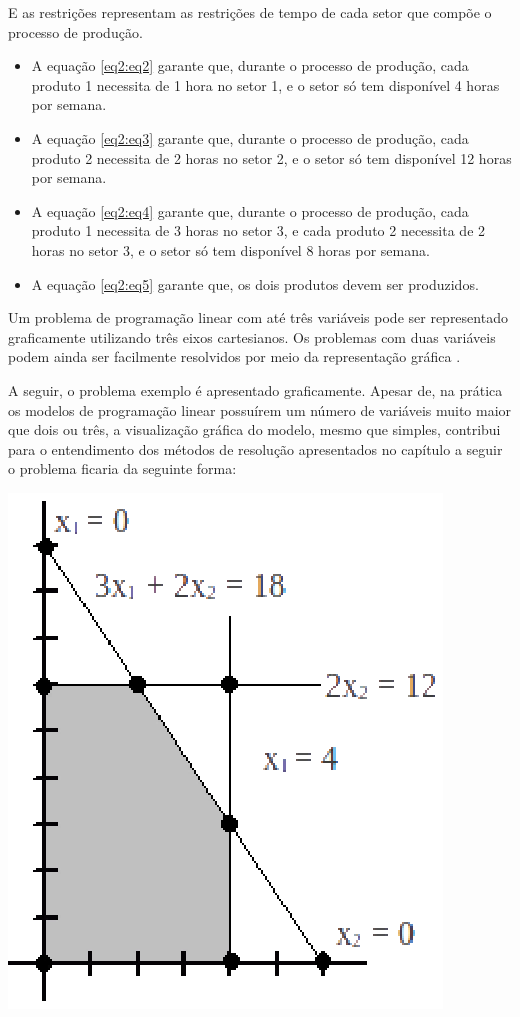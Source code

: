 E as restrições representam as restrições de tempo de cada setor que compõe o processo de produção.
\begin{itemize}
\item A equação \ref{eq2:eq2} garante que, durante o processo de produção, cada produto 1 necessita de 1 hora no setor 1, e o setor só tem disponível 4 horas por semana.
\item A equação \ref{eq2:eq3} garante que, durante o processo de produção, cada produto 2 necessita de 2 horas no setor 2, e o setor só tem disponível 12 horas por semana.
\item A equação \ref{eq2:eq4} garante que, durante o processo de produção, cada produto 1 necessita de 3 horas no setor 3, e cada produto 2 necessita de 2 horas no setor 3, e o setor só tem disponível 8 horas por semana.
\item A equação \ref{eq2:eq5} garante que, os dois produtos devem ser produzidos.
\end{itemize}

Um problema de programação linear com até três variáveis pode ser representado graficamente utilizando três eixos cartesianos. Os problemas com duas variáveis podem ainda ser facilmente resolvidos por meio da representação gráfica \cite{Passos}. 

A seguir, o problema exemplo é apresentado graficamente. Apesar de, na prática os modelos de programação linear possuírem um número de variáveis muito maior que dois ou três, a visualização gráfica do modelo, mesmo que simples, contribui para o entendimento dos métodos de resolução apresentados no capítulo a seguir
 o problema ficaria da seguinte forma:
\begin{center}
	\includegraphics[scale=2.0]{graficos/simplex_graf}
	\label{img:simplex_grafico}
\end{center}


